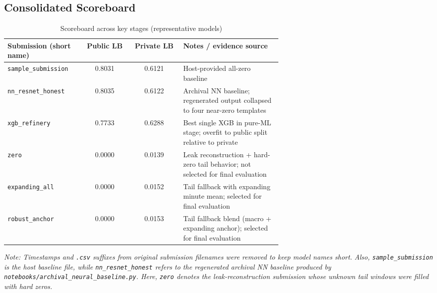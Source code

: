\subsection{Consolidated Scoreboard}
\begin{table}[htbp]
\centering
\scriptsize
\caption{Scoreboard across key stages (representative models)}
\begin{tabular}{p{0.28\linewidth} c c p{0.36\linewidth}}
\toprule
Submission (short name) & Public LB & Private LB & Notes / evidence source \\
\midrule
\texttt{sample\_submission} & 0.8031 & 0.6121 & Host-provided all-zero baseline \\
\texttt{nn\_resnet\_honest} & 0.8035 & 0.6122 & Archival NN baseline; regenerated output collapsed to four near-zero templates \\
\texttt{xgb\_refinery} & 0.7733 & 0.6288 & Best single XGB in pure-ML stage; overfit to public split relative to private \\
\texttt{zero} & 0.0000 & 0.0139 & Leak reconstruction + hard-zero tail behavior; not selected for final evaluation \\
\texttt{expanding\_all} & 0.0000 & 0.0152 & Tail fallback with expanding minute mean; selected for final evaluation \\
\texttt{robust\_anchor} & 0.0000 & 0.0153 & Tail fallback blend (macro + expanding anchor); selected for final evaluation \\
\bottomrule
\end{tabular}
\end{table}
\noindent\scriptsize
\textit{Note: Timestamps and \texttt{.csv} suffixes from original submission filenames were removed to keep model names short.}
\textit{Also, \texttt{sample\_submission} is the host baseline file, while \texttt{nn\_resnet\_honest} refers to the regenerated archival NN baseline produced by \texttt{notebooks/archival\_neural\_baseline.py}. Here, \texttt{zero} denotes the leak-reconstruction submission whose unknown tail windows were filled with hard zeros.}
\normalsize

